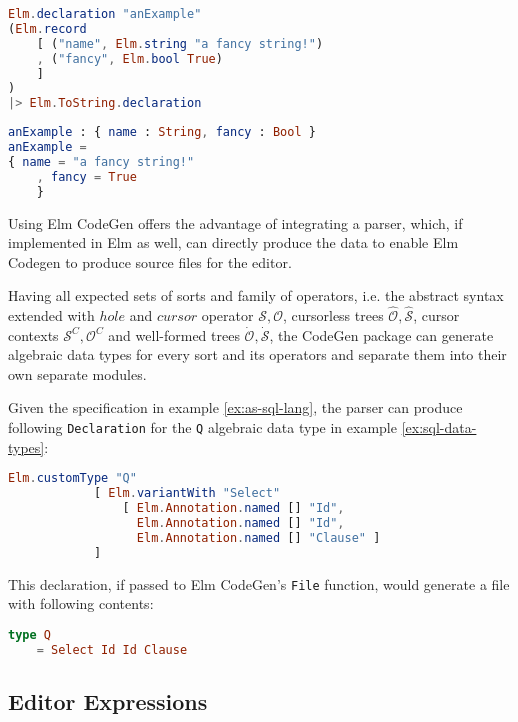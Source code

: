 \documentclass[sigplan]{acmart}
\begin{document}
\begin{lstlisting}[language=elm,caption={An Elm CodeGen declaration passed to the ToString function},label={lst:decl-codegen-ex}]
Elm.declaration "anExample"
(Elm.record
    [ ("name", Elm.string "a fancy string!")
    , ("fancy", Elm.bool True)
    ]
)
|> Elm.ToString.declaration
\end{lstlisting}

\begin{lstlisting}[language=elm,caption={Result after running code generation via the Elm-CodeGen CLI},label={lst:decl-codegen-gen}]
anExample : { name : String, fancy : Bool }
anExample =
{ name = "a fancy string!"
    , fancy = True
    }
\end{lstlisting}

Using Elm CodeGen offers the advantage of integrating a parser, which,
if implemented in Elm as well, can directly produce the data to enable
Elm Codegen to produce source files for the editor.

Having all expected sets of sorts and family of operators,
i.e. the abstract syntax extended with $hole$ and $cursor$ operator $\mathcal{S},
  \mathcal{O}$, cursorless trees $\hat{\mathcal{O}},\hat{\mathcal{S}}$,
cursor contexts $\mathcal{S}^C,\mathcal{O}^C$ and
well-formed trees $\dot{\mathcal{O}},\dot{\mathcal{S}}$,
the CodeGen package can generate algebraic data types for every sort and its operators
and separate them into their own separate modules.

\begin{example}\label{ex:parser-to-elm-codegen}
  Given the specification in example \cref{ex:as-sql-lang}, the parser can produce following \texttt{Declaration} for the \texttt{Q} algebraic data type in example \cref{ex:sql-data-types}:
  \begin{lstlisting}[language=elm]
Elm.customType "Q"
            [ Elm.variantWith "Select"
                [ Elm.Annotation.named [] "Id",
                  Elm.Annotation.named [] "Id",
                  Elm.Annotation.named [] "Clause" ]
            ]
\end{lstlisting}

  This declaration, if passed to Elm CodeGen's \texttt{File} function, would generate a file with following contents:
  \begin{lstlisting}[language=elm]
type Q
    = Select Id Id Clause
\end{lstlisting}
\end{example}

\subsection{Editor Expressions}
\end{document}
